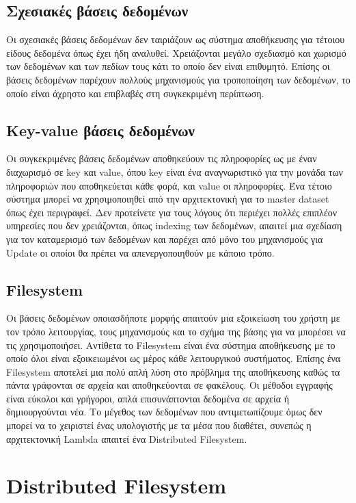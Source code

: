 \subsection{Σχεσιακές βάσεις δεδομένων}
Οι σχεσιακές βάσεις δεδομένων δεν ταιριάζουν ως σύστημα αποθήκευσης για τέτοιου είδους δεδομένα όπως έχει ήδη αναλυθεί. Χρειάζονται μεγάλο σχεδιασμό και χωρισμό των δεδομένων και των πεδίων τους κάτι το οποίο δεν είναι επιθυμητό. Επίσης οι βάσεις δεδομένων παρέχουν πολλούς μηχανισμούς για τροποποίηση των δεδομένων, το οποίο είναι άχρηστο και επιβλαβές στη συγκεκριμένη περίπτωση.

\subsection{Κey-value βάσεις δεδομένων}
Οι συγκεκριμένες βάσεις δεδομένων αποθηκεύουν τις πληροφορίες ως με έναν διαχωρισμό σε key και value, όπου key είναι ένα αναγνωριστικό για την μονάδα των πληροφοριών που αποθηκεύεται κάθε φορά, και value οι πληροφορίες. Ένα τέτοιο σύστημα μπορεί να χρησιμοποιηθεί από την αρχιτεκτονική για το master dataset όπως έχει περιγραφεί. Δεν προτείνετε για τους λόγους ότι περιέχει πολλές επιπλέον υπηρεσίες που δεν χρειάζονται, όπως indexing των δεδομένων, απαιτεί μια σχεδίαση για τον καταμερισμό των δεδομένων και παρέχει από μόνο του μηχανισμούς για Update οι οποίοι θα πρέπει να απενεργοποιηθούν με κάποιο τρόπο.

\subsection{Filesystem}
Οι βάσεις δεδομένων οποιασδήποτε μορφής απαιτούν μια εξοικείωση του χρήστη με τον τρόπο λειτουργίας, τους μηχανισμούς και το σχήμα της βάσης για να μπορέσει να τις χρησιμοποιήσει. Αντίθετα το Filesystem είναι ένα σύστημα αποθήκευσης με το οποίο όλοι είναι εξοικειωμένοι ως μέρος κάθε λειτουργικού συστήματος. Επίσης ένα Filesystem αποτελεί μια πολύ απλή λύση στο πρόβλημα της αποθήκευσης καθώς τα πάντα γράφονται σε αρχεία και αποθηκεύονται σε φακέλους. Οι μέθοδοι εγγραφής είναι εύκολοι και γρήγοροι, απλά επισυνάπτονται δεδομένα σε αρχεία ή δημιουργούνται νέα. Το μέγεθος των δεδομένων που αντιμετωπίζουμε όμως δεν μπορεί να το χειριστεί ένας υπολογιστής με τα μέσα που διαθέτει, συνεπώς η αρχιτεκτονική Lambda απαιτεί ένα Distributed Filesystem.  

\section{Distributed Filesystem}

